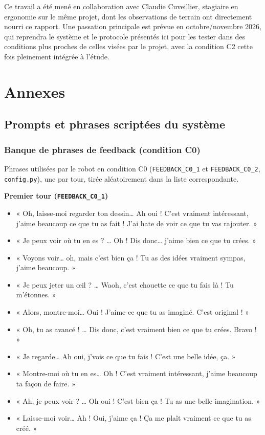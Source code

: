 \documentclass[11pt]{article}
\begin{document}
Ce travail a été mené en collaboration avec Claudie Cuveillier, stagiaire en ergonomie sur le même projet, dont les observations de terrain ont directement nourri ce rapport.
Une passation principale est prévue en octobre/novembre 2026, qui reprendra le système et le protocole présentés ici pour les tester dans des conditions plus proches de celles visées par le projet, avec la condition C2 cette fois pleinement intégrée à l'étude.

\newpage



\newpage

\appendix
\section{Annexes}

\subsection{Prompts et phrases scriptées du système}

\subsubsection{Banque de phrases de feedback (condition C0)}
\label{annexe:feedback_c0}

Phrases utilisées par le robot en condition C0 (\texttt{FEEDBACK\_C0\_1} et \texttt{FEEDBACK\_C0\_2}, \texttt{config.py}), une par tour, tirée aléatoirement dans la liste correspondante.

\textbf{Premier tour (\texttt{FEEDBACK\_C0\_1})}
\begin{itemize}[noitemsep]
    \item « Oh, laisse-moi regarder ton dessin… Ah oui ! C'est vraiment intéressant, j'aime beaucoup ce que tu as fait ! J'ai hate de voir ce que tu vas rajouter. »
    \item « Je peux voir où tu en es ? … Oh ! Dis donc… j'aime bien ce que tu crées. »
    \item « Voyons voir… oh, mais c'est bien ça ! Tu as des idées vraiment sympas, j'aime beaucoup. »
    \item « Je peux jeter un œil ? … Waoh, c'est chouette ce que tu fais là ! Tu m'étonnes. »
    \item « Alors, montre-moi… Oui ! J'aime ce que tu as imaginé. C'est original ! »
    \item « Oh, tu as avancé ! … Dis donc, c'est vraiment bien ce que tu crées. Bravo ! »
    \item « Je regarde… Ah oui, j'vois ce que tu fais ! C'est une belle idée, ça. »
    \item « Montre-moi où tu en es… Oh ! C'est vraiment intéressant, j'aime beaucoup ta façon de faire. »
    \item « Ah, je peux voir ? … Oh oui ! C'est bien ça ! Tu as une belle imagination. »
    \item « Laisse-moi voir… Ah ! Oui, j'aime ça ! Ça me plaît vraiment ce que tu as créé. »
\end{itemize}
\end{document}
